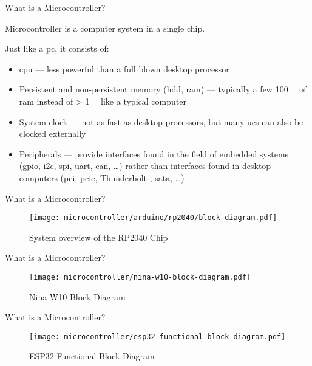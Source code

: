 \begin{frame}{What is a Microcontroller?}
    \par Microcontroller is a computer system in a single chip.
    \par Just like a \acs{pc}, it consists of:
    \begin{itemize}
        \item \acs{cpu} --- less powerful than a full blown desktop processor
        \item Persistent and non-persistent memory (\acs{hdd}, \acs{ram}) --- typically a few \SI{100}{\kibi\byte} of \acs{ram} instead of > \SI{1}{\gibi\byte} like a typical computer
        \item System clock --- not as fast as desktop processors, but many \acsp{uc} can also be clocked externally
        \item Peripherals --- provide interfaces found in the field of embedded systems (\acs{gpio}, \acs{i2c}, \acs{spi}, \acs{uart}, \acs{can}, \ldots) rather than interfaces found in desktop computers (\acs{pci}, \acs{pcie}, Thunderbolt \texttrademark, \acs{sata}, \ldots)
    \end{itemize}
\end{frame}

\begin{frame}{What is a Microcontroller?}
    \begin{figure}
        \texttt{[image: microcontroller/arduino/rp2040/block-diagram.pdf]}
        \caption{System overview of the RP2040 Chip}
    \end{figure}
\end{frame}

\begin{frame}{What is a Microcontroller?}
    \begin{figure}
        \texttt{[image: microcontroller/nina-w10-block-diagram.pdf]}
        \caption{Nina W10 Block Diagram}
    \end{figure}
\end{frame}

\begin{frame}{What is a Microcontroller?}
    \begin{figure}
        \texttt{[image: microcontroller/esp32-functional-block-diagram.pdf]}
        \caption{ESP32 Functional Block Diagram}
    \end{figure}
\end{frame}

